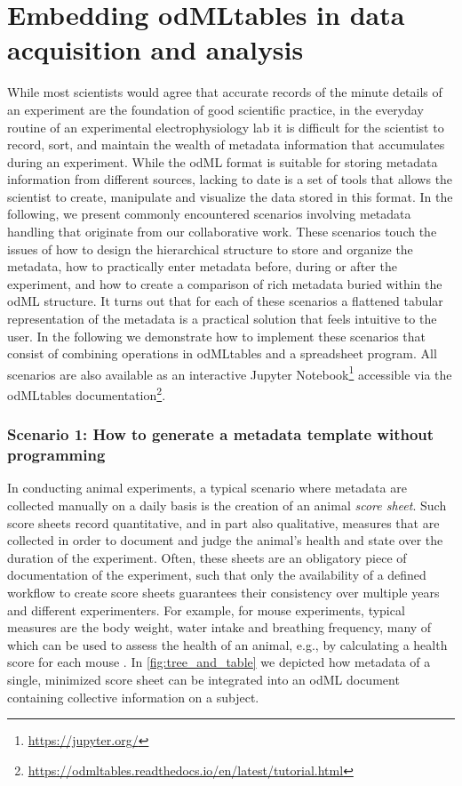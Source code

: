 {\section{Embedding odMLtables in data acquisition and analysis}
\label{sec:Illustrative-Examples}

While most scientists would agree that accurate records of the minute details of an experiment are the foundation of good scientific practice, in the everyday routine of an experimental electrophysiology lab it is difficult for the scientist to record, sort, and maintain the wealth of metadata information that accumulates during an experiment. While the odML format is suitable for storing metadata information from different sources, lacking to date is a set of tools that allows the scientist to create, manipulate and visualize the data stored in this format. In the following, we present commonly encountered scenarios involving metadata handling that originate from our collaborative work. These scenarios touch the issues of how to design the hierarchical structure to store and organize the metadata, how to practically enter metadata before, during or after the experiment, and how to create a comparison of rich metadata buried within the odML structure. It turns out that for each of these scenarios a flattened tabular representation of the metadata is a practical solution that feels intuitive to the user. In the following we demonstrate how to implement these scenarios that consist of combining operations in odMLtables and a spreadsheet program. All scenarios are also available as an interactive Jupyter Notebook\footnote{\url{https://jupyter.org/}} accessible via the odMLtables documentation\footnote{\url{https://odmltables.readthedocs.io/en/latest/tutorial.html}}.

\subsubsection*{Scenario 1: How to generate a metadata template without programming}
\label{sec:Template-Generation}
In conducting animal experiments, a typical scenario where metadata are collected manually on a daily basis is the creation of an animal \textit{score sheet}. Such score sheets record quantitative, and in part also qualitative, measures that are collected in order to document and judge the animal's health and state over the duration of the experiment. Often, these sheets are an obligatory piece of documentation of the experiment, such that only the availability of a defined workflow to create score sheets guarantees their consistency over multiple years and different experimenters. For example, for mouse experiments, typical measures are the body weight, water intake and breathing frequency, many of which can be used to assess the health of an animal, e.g., by calculating a health score for each mouse \citep{Foltz_1999, Burkholder_2012}. In \cref{fig:tree_and_table} we depicted how metadata of a single, minimized score sheet can be integrated into an odML document containing collective information on a subject.

}
